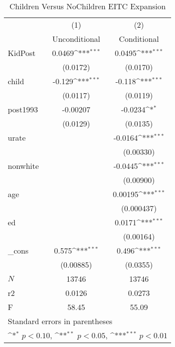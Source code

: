 \documentclass{article}
\begin{document}
\begin{enumerate}
\begin{table}[htbp]\centering
	\def\sym#1{\ifmmode^{#1}\else\(^{#1}\)\fi}
	\caption{Children Versus NoChildren EITC Expansion}
	\begin{tabular}{l*{2}{c}}
		\hline\hline
		&\multicolumn{1}{c}{(1)}&\multicolumn{1}{c}{(2)}\\
		&\multicolumn{1}{c}{Unconditional}&\multicolumn{1}{c}{Conditional}\\
		\hline
		KidPost     &      0.0469\sym{***}&      0.0495\sym{***}\\
		&    (0.0172)         &    (0.0170)         \\
		[1em]
		child       &      -0.129\sym{***}&      -0.118\sym{***}\\
		&    (0.0117)         &    (0.0119)         \\
		[1em]
		post1993    &    -0.00207         &     -0.0234\sym{*}  \\
		&    (0.0129)         &    (0.0135)         \\
		[1em]
		urate       &                     &     -0.0164\sym{***}\\
		&                     &   (0.00330)         \\
		[1em]
		nonwhite    &                     &     -0.0445\sym{***}\\
		&                     &   (0.00900)         \\
		[1em]
		age         &                     &     0.00195\sym{***}\\
		&                     &  (0.000437)         \\
		[1em]
		ed          &                     &      0.0171\sym{***}\\
		&                     &   (0.00164)         \\
		[1em]
		\_cons      &       0.575\sym{***}&       0.496\sym{***}\\
		&   (0.00885)         &    (0.0355)         \\
		\hline
		\(N\)       &       13746         &       13746         \\
		r2          &      0.0126         &      0.0273         \\
		F           &       58.45         &       55.09         \\
		\hline\hline
		\multicolumn{3}{l}{\footnotesize Standard errors in parentheses}\\
		\multicolumn{3}{l}{\footnotesize \sym{*} \(p<0.10\), \sym{**} \(p<0.05\), \sym{***} \(p<0.01\)}\\
	\end{tabular}
\end{table}





\end{enumerate}
\end{document}
